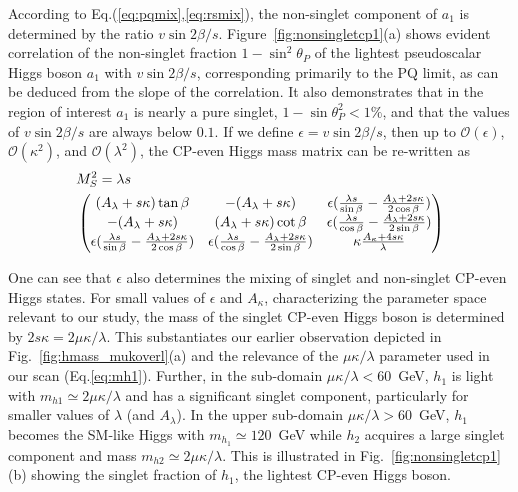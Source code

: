 \documentclass[aps,prl,twocolumn,nofootinbib,superscriptaddress]{revtex4}
\begin{document}
According to Eq.(\ref{eq:pqmix},\ref{eq:rsmix}), the non-singlet
component of $a_1$ is determined by the ratio $v \sin 2\beta / s$.
Figure~\ref{fig:nonsingletcp1}(a) shows evident correlation of the
non-singlet fraction $1 - \sin^2\theta_P$ of the lightest pseudoscalar
Higgs boson $a_1$ with $v \sin 2\beta / s$, corresponding primarily to
the PQ limit, as can be deduced from the slope of the correlation.
It also demonstrates that in the region of interest
$a_1$ is nearly a pure singlet, $1 - \sin\theta_P^2 < 1\%$, and that
the values of $v \sin 2\beta / s$ are always below $0.1$.  If we
define $\epsilon = {v \sin 2\beta / s}$, then up to
$\mathcal{O}(\epsilon)$, $\mathcal{O}(\kappa^2)$, and
$\mathcal{O}(\lambda^2)$, the CP-even Higgs mass matrix can be
re-written as
\begin{alignat}{2}
&M_S^2= \lambda s \\
\nonumber & \begin{pmatrix}
  (A_\lambda + s \kappa)\tan\beta  & - (A_\lambda + s \kappa)      & \epsilon ({\lambda s \over \sin\beta} -{A_\lambda + 2 s \kappa\over 2\cos\beta}) \\
       - (A_\lambda + s \kappa)  & (A_\lambda + s \kappa)\cot\beta  & \epsilon  ({\lambda s \over \cos\beta} -{A_\lambda + 2 s \kappa\over 2\sin\beta}) \\
\epsilon ({\lambda s \over \sin\beta} -{A_\lambda + 2 s \kappa\over 2\cos\beta}     )&   \epsilon ({\lambda s \over \cos\beta} -{A_\lambda + 2 s \kappa\over 2\sin\beta}) &
\kappa {A_\kappa+ 4 s \kappa \over \lambda}
\end{pmatrix}
\end{alignat}

One can see that $\epsilon$ also determines the mixing of singlet and
non-singlet CP-even Higgs states.  For small values of $\epsilon$ and
$A_\kappa$, characterizing the parameter space relevant to our study,
the mass of the singlet CP-even Higgs boson is determined by $2 s
\kappa = 2\mu\kappa/\lambda$.  This substantiates our earlier
observation depicted in Fig.~\ref{fig:hmass_mukoverl}(a) and the
relevance of the $\mu\kappa/\lambda$ parameter used in our scan
(Eq.\ref{eq:mh1}).  Further, in the sub-domain $\mu\kappa/\lambda <
60$~GeV, $h_1$ is light with $m_{h1} \simeq 2\mu\kappa/\lambda$ and has
a significant singlet component, particularly for smaller values of
$\lambda$ (and $A_\lambda$).  In the upper sub-domain $\mu
\kappa/\lambda > 60$~GeV, $h_1$ becomes the SM-like Higgs with
$m_{h_1} \simeq 120$~GeV while $h_2$ acquires a large singlet component
and mass $m_{h2} \simeq 2\mu\kappa/\lambda$.  This is illustrated in
Fig.~\ref{fig:nonsingletcp1}(b) showing the singlet fraction of $h_1$,
the lightest CP-even Higgs boson.
\end{document}
